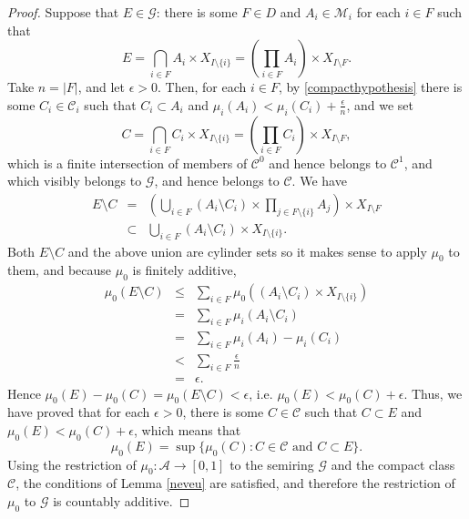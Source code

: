 \documentclass{article}
\theoremstyle{definition}
\begin{document}
\begin{proof}
Suppose that $E \in \mathscr{G}$: there is some $F \in D$ and $A_i \in \mathscr{M}_i$ for each $i \in F$ such that
\[
E = \bigcap_{i \in F} A_i \times X_{I \setminus \{i\}} = \left( \prod_{i \in F} A_i \right) \times X_{I \setminus F}.
\]
Take $n=|F|$, and
let $\epsilon>0$. Then, for each $i \in F$, by \eqref{compacthypothesis} there is some $C_i \in \mathscr{C}_i$  such that
$C_i \subset A_i$ and $\mu_i(A_i)<\mu_i(C_i)+\frac{\epsilon}{n}$, and we set
\[
C = \bigcap_{i \in F} C_i \times X_{I \setminus \{i\}}= \left( \prod_{i \in F} C_i \right) \times X_{I \setminus F},
\] 
which is a finite intersection of members of $\mathscr{C}^0$ and hence belongs to $\mathscr{C}^1$, and which visibly belongs to $\mathscr{G}$, and hence
belongs to $\mathscr{C}$. 
We have
\begin{eqnarray*}
E \setminus C &=&\left( \bigcup_{i \in F} (A_i \setminus C_i) \times \prod_{j \in F \setminus \{i\}}
A_j \right) \times X_{I \setminus F}\\
&\subset&\bigcup_{i \in F} (A_i \setminus C_i ) \times X_{I \setminus \{i\}}.
\end{eqnarray*}
Both $E \setminus C$ and the above union are cylinder sets so it makes sense to apply $\mu_0$ to them, and 
because $\mu_0$ is finitely additive,
\begin{eqnarray*}
\mu_0(E \setminus C)&\leq&\sum_{i \in F} \mu_0((A_i \setminus C_i ) \times X_{I \setminus \{i\}})\\
&=&\sum_{i \in F} \mu_i(A_i \setminus C_i)\\
&=&\sum_{i \in F} \mu_i(A_i)  - \mu_i(C_i)\\
&<&\sum_{i \in F} \frac{\epsilon}{n}\\
&=&\epsilon.
\end{eqnarray*}
Hence $\mu_0(E) - \mu_0(C) = \mu_0(E \setminus C) < \epsilon$, i.e. 
$\mu_0(E) < \mu_0(C) + \epsilon$. Thus, we have proved that for each $\epsilon>0$, there is some
$C \in \mathscr{C}$  such that $C \subset E$ and $\mu_0(E)<\mu_0(C)+\epsilon$, which means that
\[
\mu_0(E) = \sup\{\mu_0(C): \textrm{$C \in \mathscr{C}$ and $C \subset E$}\}.
\]
Using
the restriction of $\mu_0:\mathscr{A} \to [0,1]$ to the semiring $\mathscr{G}$ and the compact class $\mathscr{C}$, the conditions of
Lemma \ref{neveu} are satisfied, and therefore the restriction of $\mu_0$ to $\mathscr{G}$ is countably additive. 


\end{proof}
\end{document}
